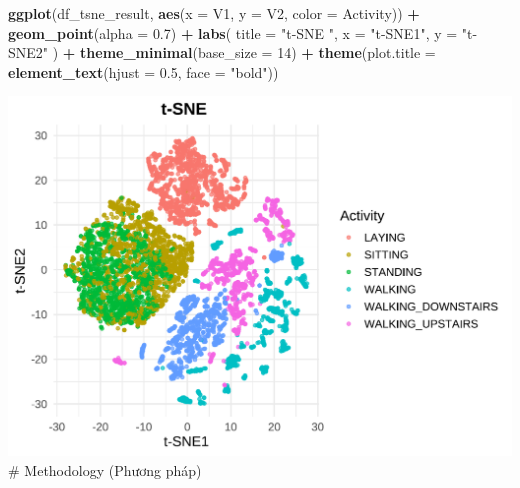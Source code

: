\documentclass[
]{article}
\newenvironment{Shaded}{\begin{snugshade}}{\end{snugshade}}
\newcommand{\AttributeTok}[1]{\textcolor[rgb]{0.13,0.29,0.53}{#1}}
\newcommand{\CommentTok}[1]{\textcolor[rgb]{0.56,0.35,0.01}{\textit{#1}}}
\newcommand{\DecValTok}[1]{\textcolor[rgb]{0.00,0.00,0.81}{#1}}
\newcommand{\FloatTok}[1]{\textcolor[rgb]{0.00,0.00,0.81}{#1}}
\newcommand{\FunctionTok}[1]{\textcolor[rgb]{0.13,0.29,0.53}{\textbf{#1}}}
\newcommand{\NormalTok}[1]{#1}
\newcommand{\OtherTok}[1]{\textcolor[rgb]{0.56,0.35,0.01}{#1}}
\newcommand{\SpecialCharTok}[1]{\textcolor[rgb]{0.81,0.36,0.00}{\textbf{#1}}}
\newcommand{\StringTok}[1]{\textcolor[rgb]{0.31,0.60,0.02}{#1}}
\begin{document}
\begin{Shaded}
\end{Shaded}

\begin{Shaded}
\begin{Highlighting}[]
\FunctionTok{ggplot}\NormalTok{(df\_tsne\_result, }\FunctionTok{aes}\NormalTok{(}\AttributeTok{x =}\NormalTok{ V1, }\AttributeTok{y =}\NormalTok{ V2, }\AttributeTok{color =}\NormalTok{ Activity)) }\SpecialCharTok{+}
  \FunctionTok{geom\_point}\NormalTok{(}\AttributeTok{alpha =} \FloatTok{0.7}\NormalTok{) }\SpecialCharTok{+}
  \FunctionTok{labs}\NormalTok{(}
    \AttributeTok{title =} \StringTok{"t{-}SNE "}\NormalTok{,}
    \AttributeTok{x =} \StringTok{"t{-}SNE1"}\NormalTok{,}
    \AttributeTok{y =} \StringTok{"t{-}SNE2"}
\NormalTok{  ) }\SpecialCharTok{+}
  \FunctionTok{theme\_minimal}\NormalTok{(}\AttributeTok{base\_size =} \DecValTok{14}\NormalTok{) }\SpecialCharTok{+}
  \FunctionTok{theme}\NormalTok{(}\AttributeTok{plot.title =} \FunctionTok{element\_text}\NormalTok{(}\AttributeTok{hjust =} \FloatTok{0.5}\NormalTok{, }\AttributeTok{face =} \StringTok{"bold"}\NormalTok{))}
\end{Highlighting}
\end{Shaded}

\includegraphics{report_files/figure-latex/unnamed-chunk-31-1.pdf} \#
Methodology (Phương pháp)
\end{document}
